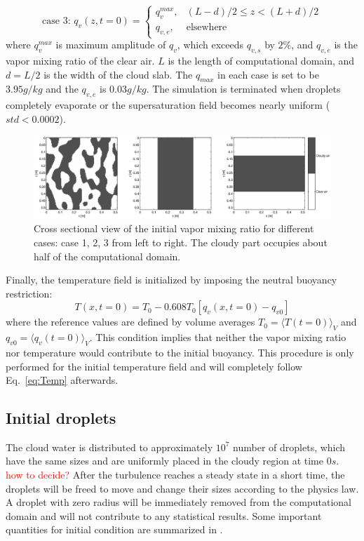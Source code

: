 \documentclass[draft,jgrga]{AGUTeX}
\newcommand{\Eq}[1]{Eq.~\eqref{#1}} \newcommand{\Fig}[1]{Figure~\ref{#1}}
\begin{document}
\begin{article}
\begin{equation}
\mbox{case 3: } q_v(z,t=0) = 
\begin{cases} 
q_v^{max}, & (L-d)/2 \le z < (L+d)/2\\
q_{v,e}, & \mbox{elsewhere}
\end{cases}\label{case3}
\end{equation}
where $q_v^{max}$ is maximum amplitude of $q_v$, which exceeds $q_{v,s}$ by $2\%$, and $q_{v,e}$ is the vapor mixing ratio of the clear air. $L$ is the length of computational domain, and $d = L/2$ is the width of the cloud slab. The $q_{max}$ in each case is set to be $3.95g/kg$ and the $q_{v,e}$ is $0.03g/kg$. The simulation is terminated when droplets completely evaporate or the supersaturation field becomes nearly uniform ($std<0.0002$).
\begin{figure}[H]
\includegraphics[width=1.0\textwidth]{Figures/v_field_case123}
\caption{Cross sectional view of the initial vapor mixing ratio for different cases: case 1, 2, 3 from left to right. The cloudy part occupies about half of the computational domain.\label{fig:v_field_case123}}
\end{figure}

Finally, the temperature field is initialized by imposing the neutral buoyancy restriction:
\begin{equation}
T(x,t = 0) = T_0 - 0.608T_0[q_v(x,t = 0) - q_{v0}]
\end{equation}
where the reference values are defined by volume averages $T_0 = \langle T(t=0)\rangle_V$ and $q_{v0} = \langle q_v(t=0)\rangle_V$. This condition implies that neither the vapor mixing ratio nor temperature would contribute to the initial buoyancy. This procedure is only performed for the initial temperature field and will completely follow \Eq{eq:Temp} afterwards.
\subsection{Initial droplets}

The cloud water is distributed to approximately $10^{7}$ number of droplets, which have the same sizes and are uniformly placed in the cloudy region at time $0s$. \textcolor{red}{how to decide?} After the turbulence reaches a steady state in a short time, the droplets will be freed to move and change their sizes according to the physics law. A droplet with zero radius will be immediately removed from the computational domain and will not contribute to any statistical results. Some important quantities for initial condition are summarized in .


\end{article}
\end{document}

